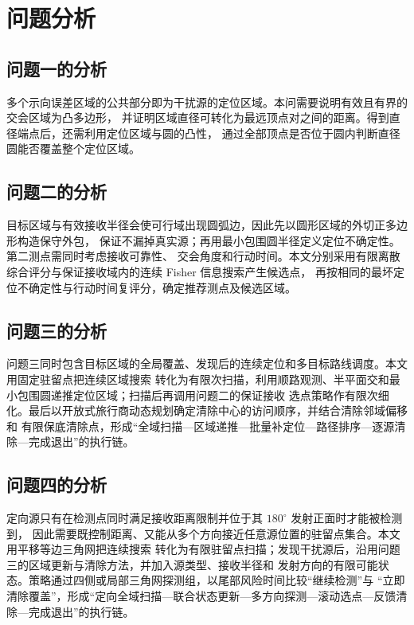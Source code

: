 \section{问题分析}

\subsection{问题一的分析}

多个示向误差区域的公共部分即为干扰源的定位区域。本问需要说明有效且有界的交会区域为凸多边形，
并证明区域直径可转化为最远顶点对之间的距离。得到直径端点后，还需利用定位区域与圆的凸性，
通过全部顶点是否位于圆内判断直径圆能否覆盖整个定位区域。

\subsection{问题二的分析}

目标区域与有效接收半径会使可行域出现圆弧边，因此先以圆形区域的外切正多边形构造保守外包，
保证不漏掉真实源；再用最小包围圆半径定义定位不确定性。第二测点需同时考虑接收可靠性、
交会角度和行动时间。本文分别采用有限离散综合评分与保证接收域内的连续 Fisher 信息搜索产生候选点，
再按相同的最坏定位不确定性与行动时间复评分，确定推荐测点及候选区域。

\subsection{问题三的分析}

问题三同时包含目标区域的全局覆盖、发现后的连续定位和多目标路线调度。本文用固定驻留点把连续区域搜索
转化为有限次扫描，利用顺路观测、半平面交和最小包围圆递推定位区域；扫描后再调用问题二的保证接收
选点策略作有限次细化。最后以开放式旅行商动态规划确定清除中心的访问顺序，并结合清除邻域偏移和
有限保底清除点，形成“全域扫描---区域递推---批量补定位---路径排序---逐源清除---完成退出”的执行链。

\subsection{问题四的分析}

定向源只有在检测点同时满足接收距离限制并位于其 $180^\circ$ 发射正面时才能被检测到，
因此需要既控制距离、又能从多个方向接近任意源位置的驻留点集合。本文用平移等边三角网把连续搜索
转化为有限驻留点扫描；发现干扰源后，沿用问题三的区域更新与清除方法，并加入源类型、接收半径和
发射方向的有限可能状态。策略通过四侧或局部三角网探测组，以尾部风险时间比较“继续检测”与
“立即清除覆盖”，形成“定向全域扫描---联合状态更新---多方向探测---滚动选点---反馈清除---完成退出”的执行链。
